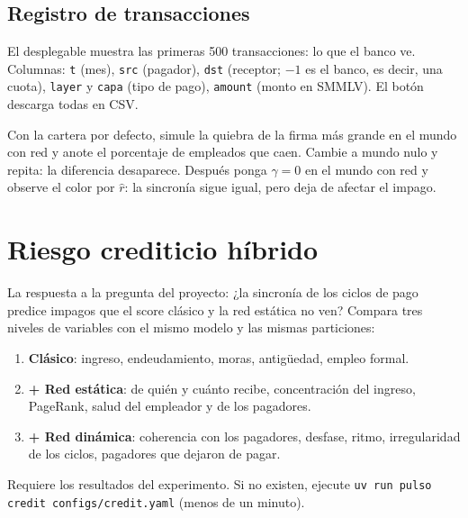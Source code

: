 \subsection*{Registro de transacciones}
El desplegable muestra las primeras 500 transacciones: lo que el banco ve. Columnas:
\texttt{t} (mes), \texttt{src} (pagador), \texttt{dst} (receptor; $-1$ es el banco, es
decir, una cuota), \texttt{layer} y \texttt{capa} (tipo de pago), \texttt{amount} (monto en
SMMLV). El botón descarga todas en CSV.

\begin{pruebe}
Con la cartera por defecto, simule la quiebra de la firma más grande en el mundo con red
y anote el porcentaje de empleados que caen. Cambie a mundo nulo y repita: la diferencia
desaparece. Después ponga $\gamma=0$ en el mundo con red y observe el color por $\hat r$:
la sincronía sigue igual, pero deja de afectar el impago.
\end{pruebe}

\section{Riesgo crediticio híbrido}


\begin{representa}
La respuesta a la pregunta del proyecto: ¿la sincronía de los ciclos de pago predice
impagos que el score clásico y la red estática no ven? Compara tres niveles de
variables con el mismo modelo y las mismas particiones:
\begin{enumerate}
\item \textbf{Clásico}: ingreso, endeudamiento, moras, antigüedad, empleo formal.
\item \textbf{+ Red estática}: de quién y cuánto recibe, concentración del ingreso,
PageRank, salud del empleador y de los pagadores.
\item \textbf{+ Red dinámica}: coherencia con los pagadores, desfase, ritmo,
irregularidad de los ciclos, pagadores que dejaron de pagar.
\end{enumerate}
\end{representa}

\begin{aviso}
Requiere los resultados del experimento. Si no existen, ejecute
\texttt{uv run pulso credit configs/credit.yaml} (menos de un minuto).
\end{aviso}

